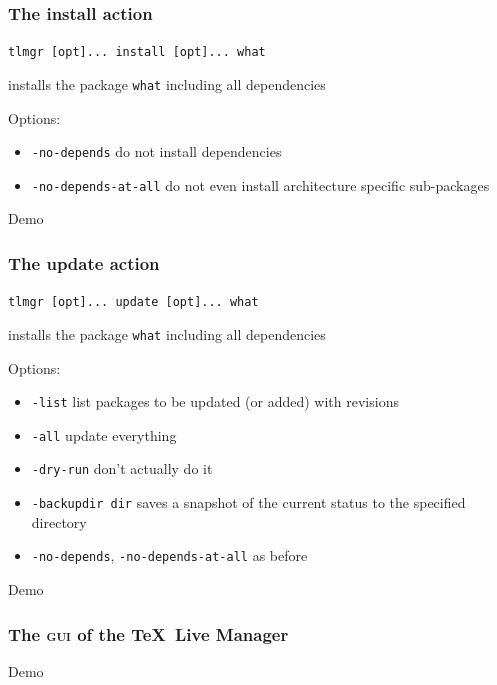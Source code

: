\documentclass{beamer}
\newcommand{\acro}[1]{\textsc{\MakeLowercase{#1}}}
\newcommand{\tlmgr}{\TeX~Live Manager}
\def\cred#1{{\color{red}#1}}
\begin{document}
\begin{frame}
  \frametitle{The install action}
  \begin{center}
    \texttt{tlmgr [opt]... install \cred{[opt]... what}}
  \end{center} 
  installs the package \texttt{what} including all dependencies

  Options:
  \begin{itemize}
  \item \texttt{-no-depends} do not install dependencies
  \item \texttt{-no-depends-at-all} do not even install architecture
    specific sub-packages
  \end{itemize}

  \pause
  Demo
\end{frame}

\begin{frame}
  \frametitle{The update action}
  \begin{center}
    \texttt{tlmgr [opt]... update \cred{[opt]... what}}
  \end{center} 
  installs the package \texttt{what} including all dependencies

  Options:
  \begin{itemize}
  \item \texttt{-list} list packages to be updated (or added) with
    revisions 
  \item \texttt{-all} update everything
  \item \texttt{-dry-run} don't actually do it
  \item \texttt{-backupdir dir} saves a snapshot of the current status to
    the specified directory
  \item \texttt{-no-depends}, \texttt{-no-depends-at-all} as before
  \end{itemize}

  \pause
  Demo
\end{frame}


\begin{frame}
  \frametitle{The \acro{GUI} of the \tlmgr}
  
  \begin{figure}[ht!]
    \centering
  \end{figure}

  Demo
\end{frame}
\end{document}

